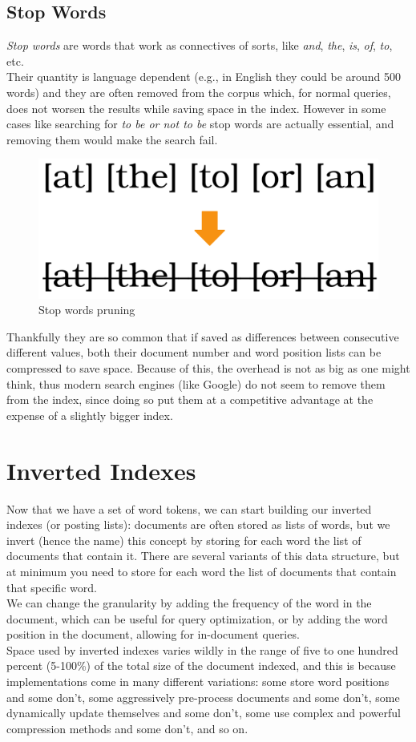 \subsection{Stop Words}

\textit{Stop words} are words that work as connectives of sorts, like \textit{and}, \textit{the}, \textit{is}, \textit{of}, \textit{to}, etc. \\
Their quantity is language dependent (e.g., in English they could be around 500 words) and they are often removed from the corpus which, for normal queries, does not worsen the results while saving space in the index. However in some cases like searching for \textit{to be or not to be} stop words are actually essential, and removing them would make the search fail. \\ 

\begin{figure} %
    \centering
    \includegraphics[width=.4\textwidth]{imgs/stopwords.png}
    \caption{Stop words pruning\label{fig:stopwords}}
\end{figure}

Thankfully they are so common that if saved as differences between consecutive different values, both their document number and word position lists can be compressed to save space. Because of this, the overhead is not as big as one might think, thus modern search engines (like Google) do not seem to remove them from the index, since doing so put them at a competitive advantage at the expense of a slightly bigger index. \\ 

\section{Inverted Indexes}

Now that we have a set of word tokens, we can start building our inverted indexes (or posting lists): documents are often stored as lists of words, but we invert (hence the name) this concept by storing for each word the list of documents that contain it. There are several variants of this data structure, but at minimum you need to store for each word the list of documents that contain that specific word. \\
We can change the granularity by adding the frequency of the word in the document, which can be useful for query optimization, or by adding the word position in the document, allowing for in-document queries.\\
Space used by inverted indexes varies wildly in the range of five to one hundred percent (5-100\%) of the total size of the document indexed, and this is because implementations come in many different variations: some store word positions and some don't, some aggressively pre-process documents and some don't, some dynamically update themselves and some don't, some use complex and powerful compression methods and some don't, and so on. 

